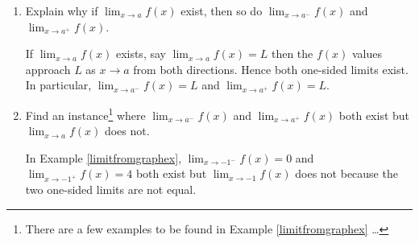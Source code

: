 \documentclass{ximera}
\begin{document}
\begin{problem} \label{twosidedonesidedlimitexistexercise}  

\begin{enumerate}  \item  Explain why if $\lim_{x \rightarrow a} f(x)$ exist, then so do $\lim_{x \rightarrow a^{-}} f(x)$ and $\lim_{x \rightarrow a^{+}} f(x)$.

\begin{solution}

 If $\lim_{x \rightarrow a} f(x)$ exists, say $\lim_{x \rightarrow a} f(x) = L$ then the $f(x)$ values approach  $L$  as $x \rightarrow a$ from both directions.  Hence both one-sided limits exist.  In particular,  $\lim_{x \rightarrow a^{-}} f(x) = L$ and $\lim_{x \rightarrow a^{+}} f(x) = L$.

 \end{solution}

\item   Find an instance\footnote{There are a few examples to be found in Example \ref{limitfromgraphex} \ldots}  where   $\lim_{x \rightarrow a^{-}} f(x)$ and $\lim_{x \rightarrow a^{+}} f(x)$ both exist but $\lim_{x \rightarrow a} f(x)$ does not.

\begin{solution}
In Example \ref{limitfromgraphex},  $\lim_{x \rightarrow -1^{-}} f(x)  = 0$ and $\lim_{x \rightarrow -1^{+}} f(x) = 4$ both exist but $\lim_{x \rightarrow -1} f(x)$ does not because the two one-sided limits are not equal.
\end{solution}

\end{enumerate}

\end{problem}
\end{document}
